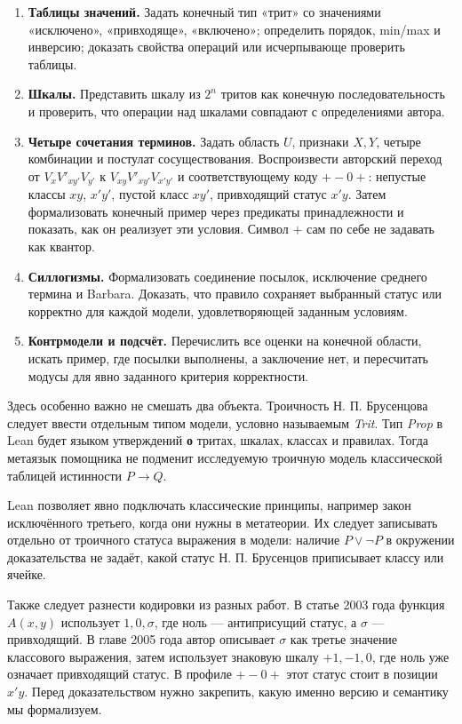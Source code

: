 \documentclass[12pt,a4paper]{article}
\begin{document}
\begin{enumerate}
\item \textbf{Таблицы значений.} Задать конечный тип «трит» со значениями «исключено», «привходяще», «включено»; определить порядок, min/max и инверсию; доказать свойства операций или исчерпывающе проверить таблицы.
\item \textbf{Шкалы.} Представить шкалу из \(2^n\) тритов как конечную последовательность и проверить, что операции над шкалами совпадают с определениями автора.
\item \textbf{Четыре сочетания терминов.} Задать область \(U\), признаки \(X,Y\), четыре комбинации и постулат сосуществования. Воспроизвести авторский переход от \(V_xV'_{xy'}V_{y'}\) к \(V_{xy}V'_{xy'}V_{x'y'}\) и соответствующему коду \(+-0+\): непустые классы \(xy\), \(x'y'\), пустой класс \(xy'\), привходящий статус \(x'y\). Затем формализовать конечный пример через предикаты принадлежности и показать, как он реализует эти условия. Символ \(+\) сам по себе не задавать как квантор.
\item \textbf{Силлогизмы.} Формализовать соединение посылок, исключение среднего термина и Barbara. Доказать, что правило сохраняет выбранный статус или корректно для каждой модели, удовлетворяющей заданным условиям.
\item \textbf{Контрмодели и подсчёт.} Перечислить все оценки на конечной области, искать пример, где посылки выполнены, а заключение нет, и пересчитать модусы для явно заданного критерия корректности.
\end{enumerate}
Здесь особенно важно не смешать два объекта. Троичность Н. П. Брусенцова следует ввести отдельным типом модели, условно называемым \emph{Trit}. Тип \emph{Prop} в Lean будет языком утверждений \textbf{о} тритах, шкалах, классах и правилах. Тогда метаязык помощника не подменит исследуемую троичную модель классической таблицей истинности \(P\to Q\).

Lean позволяет явно подключать классические принципы, например закон исключённого третьего, когда они нужны в метатеории. Их следует записывать отдельно от троичного статуса выражения в модели: наличие \(P\lor\neg P\) в окружении доказательства не задаёт, какой статус Н. П. Брусенцов приписывает классу или ячейке.

Также следует разнести кодировки из разных работ. В статье 2003 года функция \(A(x,y)\) использует \(1,0,\sigma\), где ноль — антиприсущий статус, а \(\sigma\) — привходящий. В главе 2005 года автор описывает \(\sigma\) как третье значение классового выражения, затем использует знаковую шкалу \(+1,-1,0\), где ноль уже означает привходящий статус. В профиле \(+-0+\) этот статус стоит в позиции \(x'y\). Перед доказательством нужно закрепить, какую именно версию и семантику мы формализуем.
\end{document}
